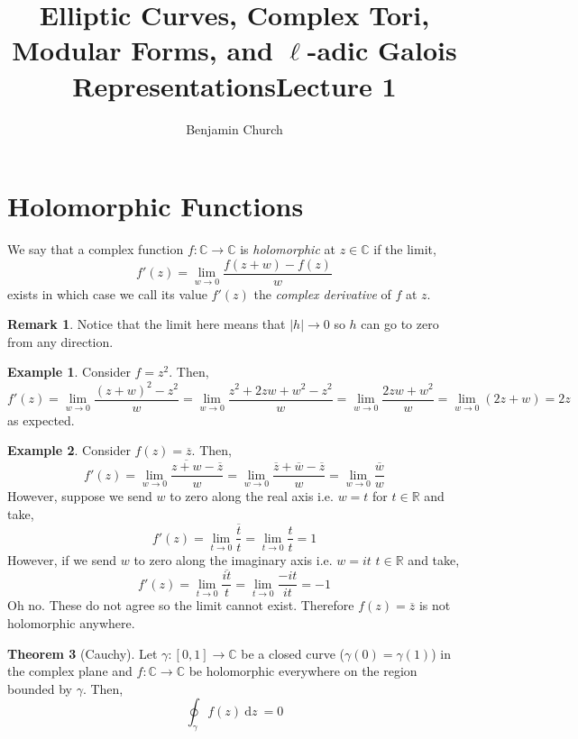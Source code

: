 \documentclass{article}
\title{Elliptic Curves, Complex Tori, Modular Forms, and $\ell$-adic Galois Representations}
\author{Benjamin Church}
\newcommand{\R}{\mathbb{R}}
\newcommand{\C}{\mathbb{C}}
\renewcommand{\d}[1]{\: \mathrm{d}#1 \:}
\theoremstyle{definition}
\newtheorem{theorem}{Theorem}[section]
\newtheorem{example}[theorem]{Example}
\newtheorem{remark}{Remark}[section]
\newenvironment{definition}[1][Definition:]{\begin{trivlist}
\item[\hskip \labelsep {\bfseries #1}]}{\end{trivlist}}
\begin{document}
\title{Lecture 1}

\maketitle

\section{Holomorphic Functions}

\begin{definition}
We say that a complex function $f : \C \to \C$ is \textit{holomorphic} at $z \in \C$ if the limit,
\[ f'(z) = \lim_{w \to 0} \frac{f(z + w) - f(z)}{w} \]
exists in which case we call its value $f'(z)$ the \textit{complex derivative} of $f$ at $z$.
\end{definition}

\begin{remark}
Notice that the limit here means that $|h| \to 0$ so $h$ can go to zero from any direction.
\end{remark}

\begin{example}
Consider $f = z^2$. Then,
\[ f'(z) = \lim_{w \to 0} \frac{(z + w)^2 - z^2}{w} = \lim_{w \to 0} \frac{z^2 + 2 zw + w^2 - z^2}{w} = \lim_{w \to 0} \frac{2zw + w^2}{w} = \lim_{w \to 0} (2 z + w) = 2 z \]
as expected.
\end{example}

\begin{example}
Consider $f(z) = \overline{z}$. Then,
\[ f'(z) = \lim_{w \to 0} \frac{\overline{z + w} - \overline{z}}{w} =  \lim_{w \to 0}  \frac{\overline{z} + \overline{w} - \overline{z}}{w} =  \lim_{w \to 0} \frac{\overline{w}}{w} \]
However, suppose we send $w$ to zero along the real axis i.e. $w = t$ for $t \in \R$ and take,
\[ f'(z) = \lim_{t \to 0} \frac{\overline{t}}{t} = \lim_{t \to 0} \frac{t}{t} = 1 \]
However, if we send $w$ to zero along the imaginary axis i.e. $w = it$ $t \in \R$ and take,
\[ f'(z) = \lim_{t \to 0} \frac{\overline{i t}}{t} = \lim_{t \to 0} \frac{-it}{it} = -1 \]
Oh no. These do not agree so the limit cannot exist. Therefore $f(z) = \overline{z}$ is not holomorphic anywhere.
\end{example}

\begin{theorem}[Cauchy]
Let $\gamma : [0, 1] \to \C$ be a closed curve ($\gamma(0) = \gamma(1)$) in the complex plane and $f : \C \to \C$ be holomorphic everywhere on the region bounded by $\gamma$. Then,
\[ \oint_\gamma f(z) \d{z} = 0 \]
\end{theorem}
\end{document}
